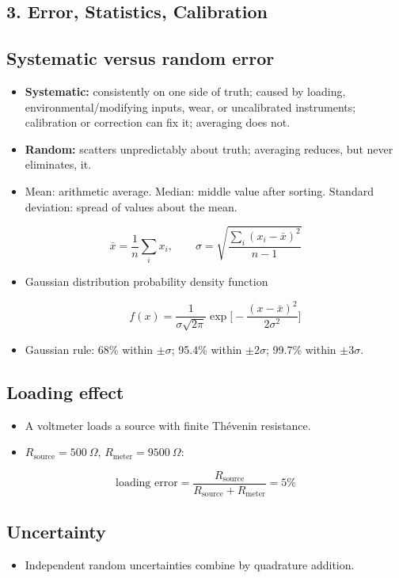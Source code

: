 \documentclass[10pt,a4paper]{ctexart}
\newcommand{\key}[1]{\textbf{#1}}
\newcommand{\formula}[1]{%
  \par\vspace{1pt}%
  \begingroup
  \setlength{\abovedisplayskip}{0pt}%
  \setlength{\belowdisplayskip}{0pt}%
  \[
    #1
  \]
  \endgroup
  \vspace{1pt}%
}
\begin{document}
\begin{multicols*}{3}
\section{3. Error, Statistics, Calibration}
\subsection{Systematic versus random error}
\begin{itemize}
  \item \key{Systematic:} consistently on one side of truth; caused by loading,
  environmental/modifying inputs, wear, or uncalibrated instruments;
  calibration or correction can fix it; averaging does not.
  \item \key{Random:} scatters unpredictably about truth; averaging reduces,
  but never eliminates, it.
  \item Mean: arithmetic average. Median: middle value after sorting. Standard deviation: spread of values about the mean.
\end{itemize}

\formula{\displaystyle
  \bar{x}=\frac{1}{n}\sum_i x_i,\qquad
  \sigma=\sqrt{\frac{\sum_i(x_i-\bar{x})^2}{n-1}}}

\begin{itemize}
  \item Gaussian distribution probability density function
  \formula{\displaystyle f(x)=\frac{1}{\sigma\sqrt{2\pi}}
  \exp\Big[-\frac{(x-\bar{x})^2}{2\sigma^2}\Big]}
  \item Gaussian rule: 68\% within $\pm\sigma$; 95.4\% within $\pm2\sigma$;
  99.7\% within $\pm3\sigma$.
\end{itemize}


\subsection{Loading effect}
\begin{itemize}
  \item A voltmeter loads a source with finite Thévenin resistance.
  \item $R_\mathrm{source}=500~\Omega$, $R_\mathrm{meter}=9500~\Omega$:
\end{itemize}

\formula{\displaystyle
  \text{loading error}=
  \frac{R_\mathrm{source}}{R_\mathrm{source}+R_\mathrm{meter}}
  =5\%}

\subsection{Uncertainty}
\begin{itemize}
  \item Independent random uncertainties combine by quadrature addition.
\end{itemize}


\end{multicols*}
\end{document}
